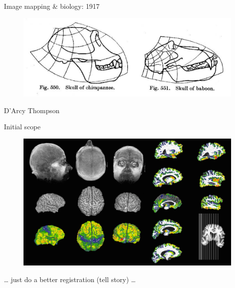 \documentclass[ignorenonframetext,]{beamer}
\begin{document}
\begin{frame}{Image mapping \& biology: 1917}

\begin{figure}[htbp]
\centering
\includegraphics{./figures/dthompson.png}
\caption{}
\end{figure}

D'Arcy Thompson

\end{frame}

\begin{frame}{Initial scope}

\begin{figure}[htbp]
\centering
\includegraphics{./figures/ants_initial_scope.png}
\caption{}
\end{figure}

\ldots{} just do a better registration (tell story) \ldots{}

\end{frame}
\end{document}
